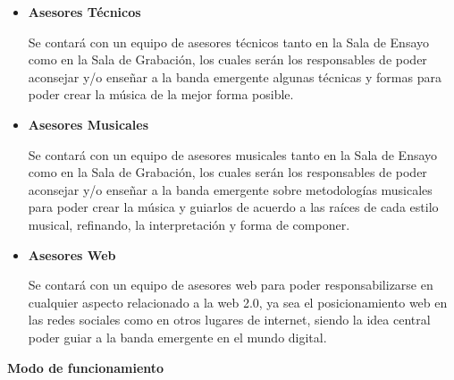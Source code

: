 \begin{itemize}
		Se contará con un equipo de asesores profesionales, los cuales
		tendrán como objetivo principal, poder guiar a una banda emergente
		en su camino a la fama, brindándole consejos a la hora de ir evolucionando,
		y entregando todo su apoyo cuando corresponda en ciertas actividades
		de un toque administrativo, con terceros que quieran relacionarse con
		clientes de \emph{Music Labs}.
	\item \textbf{Asesores Técnicos}
		
		Se contará con un equipo de asesores técnicos tanto en la Sala de Ensayo
		como en la Sala de Grabación, los cuales serán los responsables de poder
		aconsejar y/o enseñar a la banda emergente algunas técnicas y formas
		para poder crear la música de la mejor forma posible.
	\item \textbf{Asesores Musicales}
		
		Se contará con un equipo de asesores musicales tanto en la Sala de Ensayo
		como en la Sala de Grabación, los cuales serán los responsables de poder
		aconsejar y/o enseñar a la banda emergente sobre metodologías musicales
		para poder crear la música y guiarlos de acuerdo a las raíces de cada
		estilo musical, refinando, la interpretación y forma de componer.

	\item \textbf{Asesores Web}
	
		Se contará con un equipo de asesores web para poder responsabilizarse
		en cualquier aspecto relacionado a la web 2.0, ya sea el posicionamiento
		web en las redes sociales como en otros lugares de internet, siendo
		la idea central poder guiar a la banda emergente en el mundo digital.

\end{itemize}

{\bf Modo de funcionamiento}

